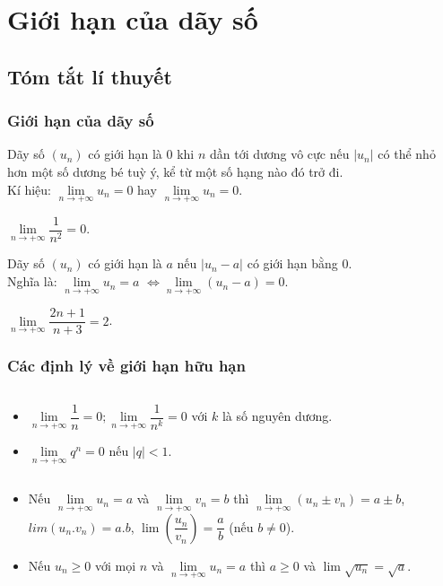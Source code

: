 \section{Giới hạn của dãy số}
\subsection{Tóm tắt lí thuyết}
\subsubsection{Giới hạn của dãy số}
\begin{dn}
	Dãy số $(u_n)$ có giới hạn là $0$ khi $n$ dần tới dương vô cực nếu $|u_n|$ có thể nhỏ hơn một số dương bé tuỳ ý, kể từ một số hạng nào đó trở đi.\\
	Kí hiệu: $\lim\limits_{n \to +\infty}u_n=0$ hay $\lim \limits_{n \to +\infty}u_n=0$.
\end{dn}

\begin{vd}
	$\lim\limits_{n \to +\infty}\dfrac{1}{n^2}=0$.
\end{vd}

\begin{dn}
	Dãy số $(u_n)$ có giới hạn là $a$ nếu $|u_n-a|$ có giới hạn bằng $0$.\\
	Nghĩa là: $\lim\limits_{n \to +\infty}u_n=a$  $\Leftrightarrow \lim\limits_{n \to +\infty}(u_n-a)=0$.
\end{dn}

\begin{vd}
	$\lim\limits_{n\to +\infty}{\dfrac{2n+1}{n+3}}=2$.
\end{vd}
\subsubsection{Các định lý về giới hạn hữu hạn}
\begin{dl}$\textrm{ }$\\
	\begin{itemize}
\item  $\lim \limits_{n \to +\infty}\dfrac{1}{n}=0; \lim \limits_{n \to +\infty}\dfrac{1}{n^k}=0$ với $k$ là số nguyên dương.\\
\item  $\lim \limits_{n \to +\infty}q^n=0$ nếu $|q|<1$.
\end{itemize}
\end{dl}

\begin{dl}$\textrm{ }$\\
	\begin{itemize}
		\item  Nếu $\lim \limits_{n \to +\infty}u_n=a$ và $\lim \limits_{n \to +\infty}v_n=b$  thì $\lim \limits_{n \to +\infty}\left(u_n\pm v_n\right)=a\pm b$, $lim \left(u_n.v_n\right)=a.b$, $\lim\left(\dfrac{u_n}{v_n}\right)=\dfrac{a}{b}$ (nếu $b\neq 0$).
		\item  Nếu $u_n\geq 0$ với mọi $n$ và $\lim \limits_{n \to +\infty}u_n=a$ thì $a\geq 0$ và $\lim\sqrt{u_n}=\sqrt{a}$.
	\end{itemize}
\end{dl}

